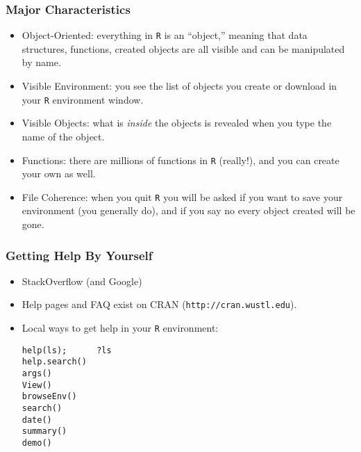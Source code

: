 \documentclass{beamer}
\begin{document}
\begin{frame}
\frametitle{Major Characteristics}
\begin{itemize}
    \item   Object-Oriented: everything in 	\texttt{R} is an ``object,'' meaning that data structures, functions, created 
            objects are all visible and can be manipulated by name.
    \item   Visible Environment: you see the list of objects you create or download in your 	\texttt{R} environment window.
    \item   Visible Objects: what is \emph{inside} the objects is revealed when you type the name of the object.
    \item   Functions: there are millions of functions in 	\texttt{R} (really!), and you can create your own as well.
    \item   File Coherence: when you quit 	\texttt{R} you will be asked if you want to save your environment (you generally do), and if you say no
            every object created will be gone.
\end{itemize}
\end{frame}

\begin{frame}[fragile]
\frametitle{Getting Help By Yourself}
\begin{itemize}[<+->]
\item StackOverflow (and Google)
	\item	Help pages and FAQ exist on CRAN (\texttt{http://cran.wustl.edu}).
    \item   Local ways to get help in your 	\texttt{R} environment:
            \begin{verbatim}
help(ls);      ?ls
help.search()
args()
View()
browseEnv()
search()
date()
summary()
demo()
            \end{verbatim}
\end{itemize}
\end{frame}
\end{document}
